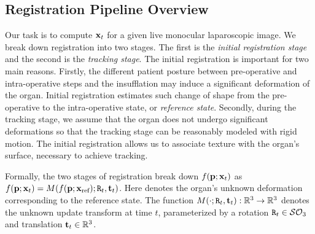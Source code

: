 \subsection{Registration Pipeline Overview}
\label{sec:globalOverview}
Our task is to compute $\mathbf{x}_t$ for a given live monocular laparoscopic image.
We break down registration into two stages. The first is the \textit{initial registration stage} and the second is the \emph{tracking stage}. 
The initial registration is important for two main reasons. Firstly, the different patient posture between pre-operative and intra-operative steps and the insufflation may induce a significant deformation of the organ. Initial registration estimates such change of shape from the pre-operative to the intra-operative state, or \emph{reference state}. 
Secondly, during the tracking stage, we assume that the organ does not undergo significant deformations so that the tracking stage can be reasonably modeled with rigid motion.  The initial registration allows us to associate texture with the organ's surface, necessary to achieve tracking.

Formally, the two stages of registration break down $f(\mathbf{p};\mathbf{x}_t)$ as $f(\vet{p};\vet{x}_{t})=M(f(\vet{p};\xref);\mat{R}_{t},\vet{t}_{t})$. Here \xref denotes the organ's unknown deformation corresponding to the reference state.
The function $M(\cdot;\mat{R}_{t},\vet{t}_{t}):\mathbb{R}^3\rightarrow \mathbb{R}^3$ denotes the unknown update transform at time $t$, parameterized by a rotation $\mat{R}_{t}\in \mathcal{SO}_{3}$ and translation $\mathbf{t}_{t}\in \mathbb{R}^3$.

